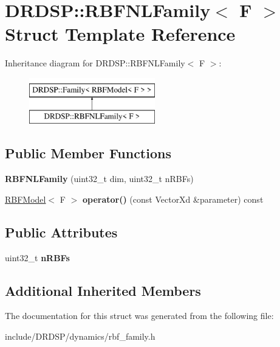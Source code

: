 \hypertarget{struct_d_r_d_s_p_1_1_r_b_f_n_l_family}{\section{D\-R\-D\-S\-P\-:\-:R\-B\-F\-N\-L\-Family$<$ F $>$ Struct Template Reference}
\label{struct_d_r_d_s_p_1_1_r_b_f_n_l_family}
}
Inheritance diagram for D\-R\-D\-S\-P\-:\-:R\-B\-F\-N\-L\-Family$<$ F $>$\-:\begin{figure}[H]
\begin{center}
\leavevmode
\includegraphics[height=2.000000cm]{struct_d_r_d_s_p_1_1_r_b_f_n_l_family}
\end{center}
\end{figure}
\subsection*{Public Member Functions}
\begin{DoxyCompactItemize}
\item 
\hypertarget{struct_d_r_d_s_p_1_1_r_b_f_n_l_family_a0219576ef1ddd2dc48962f449458f14e}{{\bfseries R\-B\-F\-N\-L\-Family} (uint32\-\_\-t dim, uint32\-\_\-t n\-R\-B\-Fs)}\label{struct_d_r_d_s_p_1_1_r_b_f_n_l_family_a0219576ef1ddd2dc48962f449458f14e}

\item 
\hypertarget{struct_d_r_d_s_p_1_1_r_b_f_n_l_family_ae987ecfe949a27183c7da1440f422cd1}{\hyperlink{struct_d_r_d_s_p_1_1_r_b_f_model}{R\-B\-F\-Model}$<$ F $>$ {\bfseries operator()} (const Vector\-Xd \&parameter) const }\label{struct_d_r_d_s_p_1_1_r_b_f_n_l_family_ae987ecfe949a27183c7da1440f422cd1}

\end{DoxyCompactItemize}
\subsection*{Public Attributes}
\begin{DoxyCompactItemize}
\item 
\hypertarget{struct_d_r_d_s_p_1_1_r_b_f_n_l_family_ac785528e1f2390ad44ed396a4198253d}{uint32\-\_\-t {\bfseries n\-R\-B\-Fs}}\label{struct_d_r_d_s_p_1_1_r_b_f_n_l_family_ac785528e1f2390ad44ed396a4198253d}

\end{DoxyCompactItemize}
\subsection*{Additional Inherited Members}


The documentation for this struct was generated from the following file\-:\begin{DoxyCompactItemize}
\item 
include/\-D\-R\-D\-S\-P/dynamics/rbf\-\_\-family.\-h\end{DoxyCompactItemize}
